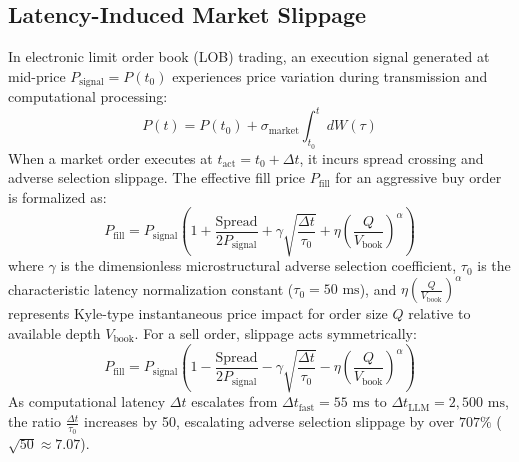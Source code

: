 \documentclass[journal,compsoc]{IEEEtran}
\begin{document}
\subsection{Latency-Induced Market Slippage}
In electronic limit order book (LOB) trading, an execution signal generated at mid-price $P_{\text{signal}} = P(t_0)$ experiences price variation during transmission and computational processing:
\begin{equation}
P(t) = P(t_0) + \sigma_{\text{market}} \int_{t_0}^{t} dW(\tau)
\end{equation}
When a market order executes at $t_{\text{act}} = t_0 + \Delta t$, it incurs spread crossing and adverse selection slippage. The effective fill price $P_{\text{fill}}$ for an aggressive buy order is formalized as:
\begin{equation}
P_{\text{fill}} = P_{\text{signal}} \left( 1 + \frac{\text{Spread}}{2 P_{\text{signal}}} + \gamma \sqrt{\frac{\Delta t}{\tau_0}} + \eta \left(\frac{Q}{V_{\text{book}}}\right)^\alpha \right)
\end{equation}
where $\gamma$ is the dimensionless microstructural adverse selection coefficient, $\tau_0$ is the characteristic latency normalization constant ($\tau_0 = 50 \text{ ms}$), and $\eta \left(\frac{Q}{V_{\text{book}}}\right)^\alpha$ represents Kyle-type instantaneous price impact for order size $Q$ relative to available depth $V_{\text{book}}$. For a sell order, slippage acts symmetrically:
\begin{equation}
P_{\text{fill}} = P_{\text{signal}} \left( 1 - \frac{\text{Spread}}{2 P_{\text{signal}}} - \gamma \sqrt{\frac{\Delta t}{\tau_0}} - \eta \left(\frac{Q}{V_{\text{book}}}\right)^\alpha \right)
\end{equation}
As computational latency $\Delta t$ escalates from $\Delta t_{\text{fast}} = 55 \text{ ms}$ to $\Delta t_{\text{LLM}} = 2,500 \text{ ms}$, the ratio $\frac{\Delta t}{\tau_0}$ increases by 50, escalating adverse selection slippage by over $707\%$ ($\sqrt{50} \approx 7.07$).
\end{document}
